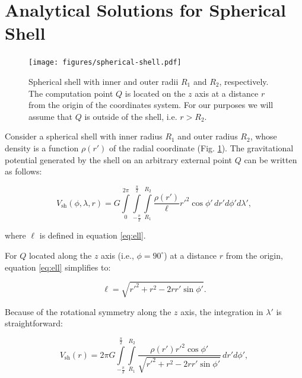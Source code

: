 \documentclass[extra, referee]{gji}
\begin{document}




\appendix

\section{Analytical Solutions for Spherical Shell}
\label{sec:shell}

\begin{figure}
\centering
\texttt{[image: figures/spherical-shell.pdf]}
\caption{
    Spherical shell with inner and outer radii $R_1$ and $R_2$, respectively.
    The computation point $Q$ is located on the $z$ axis at a distance $r$ from
    the origin of the coordinates system.
    For our purposes we will assume that $Q$ is outside of the shell,
    i.e. $r > R_2$.
}
\label{fig:spherical-shell}
\end{figure}

Consider a spherical shell with inner radius $R_1$ and outer radius $R_2$,
whose density is a function $\rho(r')$ of the radial coordinate
(Fig. \ref{fig:spherical-shell}).
The gravitational potential generated by the shell on an arbitrary external
point $Q$ can be written as follows:

\begin{equation}
    V_\text{sh}(\phi, \lambda, r) = G
    \int\limits_0^{2\pi}
    \int\limits_{-\frac{\pi}{2}}^\frac{\pi}{2}
    \int\limits_{R_1}^{R_2}
    \frac{\rho(r')}{\ell} {r'}^2 \cos\phi' \,
    dr' d\phi' d\lambda',
\end{equation}

\noindent where $\ell$ is defined in equation \ref{eq:ell}.

For $Q$ located along the $z$ axis (i.e., $\phi=90^\circ$) at a distance $r$ from the
origin, equation \ref{eq:ell} simplifies to:

\begin{equation}
    \ell = \sqrt{r'^2 + r^2 - 2 r r' \sin\phi'}.
\end{equation}

\noindent
Because of the rotational symmetry along the $z$ axis, the integration in $\lambda'$ is
straightforward:

\begin{equation}
    V_\text{sh}(r) = 2\pi G
    \int\limits_{-\frac{\pi}{2}}^\frac{\pi}{2}
    \int\limits_{R_1}^{R_2}
    \frac{\rho(r') {r'}^2 \cos\phi'}{\sqrt{r'^2 + r^2 - 2 r r' \sin\phi'}}
    \, dr' d\phi',
\end{equation}
\end{document}
